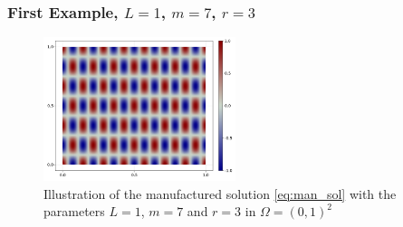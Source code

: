 \subsubsection{First Example, $L=1$, $m=7$, $r=3$}%
\label{sub:second_example}

\begin{figure}[tbh!]
    \centering
    \includegraphics[width=0.5\textwidth]{figures/model/l_1.0_m_7_r_3n_100_sol.png}
    \caption{Illustration of the manufactured solution \eqref{eq:man_sol}   with the parameters $L=1$, $m=7$ and $r=3$ in $\Omega = (0,1)^2$}
    \label{fig:sol_l1_m7_r3}
\end{figure}

